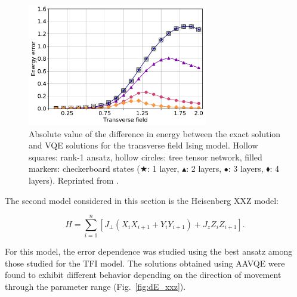 \begin{figure}
    \centering
    \includegraphics[width=0.7\textwidth]{../figures/dE_ising.pdf}
    \caption{Absolute value of the difference in energy between the exact solution and VQE solutions for the transverse field Ising model. Hollow squares: rank-1 ansatz, hollow circles: tree tensor network, filled markers: checkerboard states ($\bigstar$: 1 layer, $\blacktriangle$: 2 layers, $\bullet$: 3 layers, $\blacklozenge$: 4 layers). Reprinted from \cite{uvarov_machine_2020}.}
    \label{fig:dE_ising}
\end{figure}

The second model considered in this section is the Heisenberg XXZ model:

\begin{equation}
    \label{eq:heisenberg_xxz}
    H = \sum_{i=1}^n \left[J_\perp\left(X_i X_{i+1} + Y_i Y_{i+1}\right)
        + J_z Z_i Z_{i+1}\right].
\end{equation}

For this model, the error dependence was studied using the best ansatz among those studied for the TFI model. The solutions obtained using AAVQE were found to exhibit different behavior depending on the direction of movement through the parameter range (Fig.~\ref{fig:dE_xxz}).

